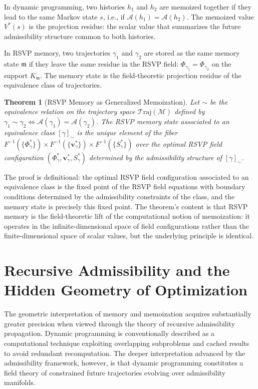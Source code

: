 \documentclass[12pt, a4paper, openany]{book}
\theoremstyle{plain}
\newtheorem{theorem}{Theorem}[chapter]
\theoremstyle{definition}
\theoremstyle{remark}
\newcommand{\vvec}{\mathbf{v}}
\newcommand{\Sfield}{S}
\newcommand{\Adm}{\mathcal{A}}
\newcommand{\Traj}{\mathcal{T}\mathrm{raj}}
\begin{document}
In dynamic programming, two histories $h_1$ and $h_2$ are memoized together if they lead to the same Markov state $s$, i.e., if $\Adm(h_1) = \Adm(h_2)$. The memoized value $V^*(s)$ is the projection residue: the scalar value that summarizes the future admissibility structure common to both histories.

In RSVP memory, two trajectories $\gamma_1$ and $\gamma_2$ are stored as the same memory state $\mathfrak{m}$ if they leave the same residue in the RSVP field: $\Phi_{\gamma_1} = \Phi_{\gamma_2}$ on the support $K_\mathfrak{m}$. The memory state is the field-theoretic projection residue of the equivalence class of trajectories.

\begin{theorem}[RSVP Memory as Generalized Memoization]
Let $\sim$ be the equivalence relation on the trajectory space $\Traj(\mathcal{M})$ defined by $\gamma_1 \sim \gamma_2 \iff \Adm(\gamma_1) = \Adm(\gamma_2)$. The RSVP memory state associated to an equivalence class $[\gamma]_\sim$ is the unique element of the fiber $F^{-1}(\{\Phi^*_{\gamma}\}) \times F^{-1}(\{\vvec^*_\gamma\}) \times F^{-1}(\{\Sfield^*_\gamma\})$ over the optimal RSVP field configuration $(\Phi^*_\gamma, \vvec^*_\gamma, \Sfield^*_\gamma)$ determined by the admissibility structure of $[\gamma]_\sim$.
\end{theorem}

The proof is definitional: the optimal RSVP field configuration associated to an equivalence class is the fixed point of the RSVP field equations with boundary conditions determined by the admissibility constraints of the class, and the memory state is precisely this fixed point. The theorem's content is that RSVP memory is the field-theoretic lift of the computational notion of memoization: it operates in the infinite-dimensional space of field configurations rather than the finite-dimensional space of scalar values, but the underlying principle is identical.

\section{Recursive Admissibility and the Hidden Geometry of Optimization}

The geometric interpretation of memory and memoization acquires substantially greater precision when viewed through the theory of recursive admissibility propagation. Dynamic programming is conventionally described as a computational technique exploiting overlapping subproblems and cached results to avoid redundant recomputation. The deeper interpretation advanced by the admissibility framework, however, is that dynamic programming constitutes a field theory of constrained future trajectories evolving over admissibility manifolds.
\end{document}
